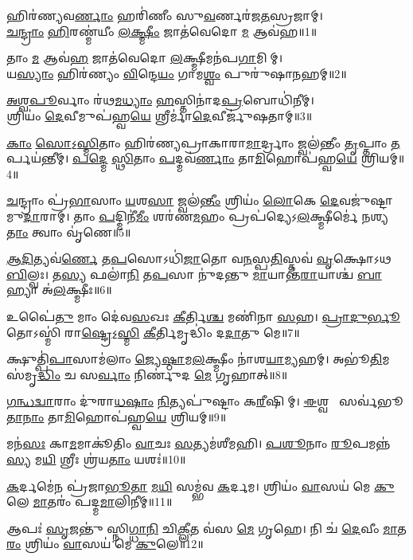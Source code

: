 

{\centering
𑌹𑌿𑌰॑𑌣𑍍𑌯𑌵\ul{𑌰𑍍𑌣𑌾𑌂} 𑌹𑌰𑌿॑𑌣𑍀𑌂 𑌸𑍁\ul{𑌵}𑌰𑍍𑌣𑌰॑𑌜\ul{𑌤}𑌸𑍍𑌰𑌜𑌾𑌮𑍍।\\
\ul{𑌚}\ul{𑌨𑍍𑌦𑍍𑌰𑌾𑌂} \ul{𑌹𑌿}𑌰𑌣𑍍𑌮॑𑌯𑍀𑌂 \ul{𑌲}\ul{𑌕𑍍𑌷𑍍𑌮𑍀𑌂} 𑌜𑌾𑌤॑𑌵𑍇𑌦𑍋 \ul{𑌮} 𑌆𑌵॑𑌹॥1॥

𑌤𑌾𑌂 \ul{𑌮} 𑌆𑌵॑\ul{𑌹} 𑌜𑌾𑌤॑𑌵𑍇𑌦𑍋 \ul{𑌲}𑌕𑍍𑌷𑍍𑌮𑍀𑌮𑌨॑𑌪\ul{𑌗𑌾}𑌮𑌿𑌨𑍀᳚𑌮𑍍।\\
𑌯\ul{𑌸𑍍𑌯𑌾𑌂} 𑌹𑌿𑌰॑𑌣𑍍𑌯𑌂 \ul{𑌵𑌿}𑌨𑍍𑌦𑍇\ul{𑌯𑌂} 𑌗𑌾𑌮\ul{𑌶𑍍𑌵𑌂} 𑌪𑍁𑌰𑍁॑𑌷𑌾\ul{𑌨}𑌹𑌮𑍍॥2॥

\ul{𑌅}\ul{𑌶𑍍𑌵}\ul{𑌪𑍂}𑌰𑍍𑌵𑌾𑌂 𑌰॑𑌥\ul{𑌮}\ul{𑌧𑍍𑌯𑌾𑌂} \ul{𑌹}𑌸𑍍𑌤𑌿𑌨𑌾॑𑌦\ul{𑌪𑍍𑌰}𑌬𑍋𑌧𑌿॑𑌨𑍀𑌮𑍍।\\
𑌶𑍍𑌰𑌿𑌯𑌂॑ \ul{𑌦𑍇}𑌵𑍀𑌮𑍁𑌪॑𑌹𑍍𑌵\ul{𑌯𑍇} 𑌶𑍍𑌰𑍀𑌰𑍍𑌮𑌾॑\ul{𑌦𑍇}𑌵𑍀𑌰𑍍𑌜𑍁॑𑌷𑌤𑌾𑌮𑍍॥3॥

}

\ul{𑌕𑌾𑌂} \ul{𑌸𑍋}𑌽॒\ul{𑌸𑍍𑌮𑌿}𑌤𑌾𑌂 𑌹𑌿𑌰॑𑌣𑍍𑌯𑌪𑍍𑌰𑌾𑌕𑌾𑌰𑌾\ul{𑌮𑌾}𑌰𑍍𑌦𑍍𑌰𑌾𑌂 𑌜𑍍𑌵𑌲॑𑌨𑍍𑌤𑍀𑌂 \ul{𑌤𑍃}𑌪𑍍𑌤𑌾𑌂 \ul{𑌤}𑌰𑍍𑌪𑌯॑𑌨𑍍𑌤𑍀𑌮𑍍।
\ul{𑌪}\ul{𑌦𑍍𑌮𑍇} \ul{𑌸𑍍𑌥𑌿}𑌤𑌾𑌂 \ul{𑌪}𑌦𑍍𑌮𑌵॑\ul{𑌰𑍍𑌣𑌾𑌂} 𑌤𑌾\ul{𑌮𑌿}𑌹𑍋𑌪॑𑌹𑍍𑌵\ul{𑌯𑍇} 𑌶𑍍𑌰𑌿𑌯𑌮𑍍॥4॥

\ul{𑌚}𑌨𑍍𑌦𑍍𑌰𑌾𑌂 𑌪𑍍𑌰॑\ul{𑌭𑌾}𑌸𑌾𑌂 \ul{𑌯}𑌶\ul{𑌸𑌾} 𑌜𑍍𑌵𑌲॑\ul{𑌨𑍍𑌤𑍀𑌂} 𑌶𑍍𑌰𑌿𑌯𑌂॑ \ul{𑌲𑍋}𑌕𑍇 \ul{𑌦𑍇}𑌵𑌜𑍁॑𑌷𑍍𑌟𑌾𑌮𑍁\ul{𑌦𑌾}𑌰𑌾𑌮𑍍।
𑌤𑌾𑌂 \ul{𑌪}𑌦𑍍𑌮𑌿𑌨𑍀॑\ul{𑌮𑍀𑌂} 𑌶𑌰॑𑌣\ul{𑌮}𑌹𑌂 𑌪𑍍𑌰𑌪॑𑌦𑍍𑌯𑍇𑌽\ul{𑌲}𑌕𑍍𑌷𑍍𑌮𑍀𑌰𑍍𑌮𑍇॑ 𑌨𑌶𑍍𑌯\ul{𑌤𑌾𑌂} 𑌤𑍍𑌵𑌾𑌂 𑌵𑍃॑𑌣𑍇॥5॥

\ul{𑌆}\ul{𑌦𑌿}𑌤𑍍𑌯𑌵॑\ul{𑌰𑍍𑌣𑍇} 𑌤\ul{𑌪}𑌸𑍋𑌽𑌧𑌿॑\ul{𑌜𑌾}𑌤𑍋 𑌵\ul{𑌨}𑌸𑍍𑌪\ul{𑌤𑌿}𑌸𑍍𑌤𑌵॑ \ul{𑌵𑍃}𑌕𑍍𑌷𑍋𑌽𑌥 \ul{𑌬𑌿}𑌲𑍍𑌵𑌃।
𑌤\ul{𑌸𑍍𑌯} 𑌫𑌲𑌾॑\ul{𑌨𑌿} 𑌤\ul{𑌪}𑌸𑌾 𑌨𑍁॑𑌦𑌨𑍍𑌤𑍁 \ul{𑌮𑌾}𑌯𑌾𑌨𑍍𑌤॑\ul{𑌰𑌾}𑌯𑌾𑌶𑍍𑌚॑ \ul{𑌬𑌾}𑌹𑍍𑌯𑌾 𑌅॑\ul{𑌲}𑌕𑍍𑌷𑍍𑌮𑍀𑌃॥6॥

𑌉𑌪𑍈॑\ul{𑌤𑍁} 𑌮𑌾𑌂 𑌦𑍇॑𑌵\ul{𑌸}𑌖𑌃 \ul{𑌕𑍀}𑌰𑍍𑌤𑌿\ul{𑌶𑍍𑌚} 𑌮𑌣𑌿॑𑌨𑌾 \ul{𑌸}𑌹।
\ul{𑌪𑍍𑌰𑌾}\ul{𑌦𑍁}\ul{𑌰𑍍𑌭𑍂}𑌤𑍋𑌽𑌸𑍍𑌮𑌿॑ 𑌰𑌾\ul{𑌷𑍍𑌟𑍍𑌰𑍇}𑌽॒\ul{𑌸𑍍𑌮𑌿}\an{} \ul{𑌕𑍀}𑌰𑍍𑌤𑌿𑌮𑍃𑌦𑍍𑌧𑌿𑌂॑ 𑌦\ul{𑌦𑌾}𑌤𑍁 𑌮𑍇॥7॥

𑌕𑍍𑌷𑍁𑌤𑍍𑌪𑌿॑\ul{𑌪𑌾}𑌸𑌾𑌮॑𑌲𑌾𑌂 \ul{𑌜𑍍𑌯𑍇}\ul{𑌷𑍍𑌠𑌾}𑌮\ul{𑌲}𑌕𑍍𑌷𑍍𑌮𑍀𑌂 𑌨𑌾॑𑌶\ul{𑌯𑌾}𑌮𑍍𑌯𑌹𑌮𑍍।
𑌅𑌭𑍂॑\ul{𑌤𑌿}\-𑌮𑌸॑𑌮𑍃\ul{𑌦𑍍𑌧𑌿𑌂} 𑌚 𑌸\ul{𑌰𑍍𑌵𑌾𑌂} 𑌨𑌿𑌰𑍍𑌣𑍁॑𑌦 \ul{𑌮𑍇} 𑌗𑍃𑌹𑌾𑌤𑍍॥8॥

\ul{𑌗}\ul{𑌨𑍍𑌧}\ul{𑌦𑍍𑌵𑌾}𑌰𑌾𑌂 𑌦𑍁॑𑌰𑌾\ul{𑌧}\ar{}\ul{𑌷𑌾𑌂} \ul{𑌨𑌿}𑌤𑍍𑌯𑌪𑍁॑𑌷𑍍𑌟𑌾𑌂 𑌕\ul{𑌰𑍀}𑌷𑌿𑌣𑍀᳚𑌮𑍍।
\ul{𑌈}𑌶𑍍𑌵𑌰𑍀𑌂᳚ 𑌸𑌰𑍍𑌵॑𑌭𑍂\ul{𑌤𑌾}\ul{𑌨𑌾𑌂} 𑌤𑌾\ul{𑌮𑌿}𑌹𑍋𑌪॑𑌹𑍍𑌵\ul{𑌯𑍇} 𑌶𑍍𑌰𑌿𑌯𑌮𑍍॥9॥

𑌮𑌨॑\ul{𑌸𑌃} 𑌕𑌾\ul{𑌮}𑌮𑌾𑌕𑍂॑𑌤𑌿𑌂 \ul{𑌵𑌾}𑌚𑌃 \ul{𑌸}𑌤𑍍𑌯𑌮॑𑌶𑍀𑌮𑌹𑌿।
\ul{𑌪}\ul{𑌶𑍂}𑌨𑌾𑌂 \ul{𑌰𑍂}𑌪𑌮𑌨𑍍𑌨॑\ul{𑌸𑍍𑌯} 𑌮\ul{𑌯𑌿} 𑌶𑍍𑌰𑍀𑌃 𑌶𑍍𑌰॑𑌯\ul{𑌤𑌾𑌂} 𑌯𑌶𑌃॑॥10॥

\ul{𑌕}𑌰𑍍𑌦𑌮𑍇॑𑌨 𑌪𑍍𑌰॑𑌜𑌾\ul{𑌭𑍂}\ul{𑌤𑌾} \ul{𑌮}\ul{𑌯𑌿} 𑌸𑌮𑍍𑌭॑𑌵 \ul{𑌕}𑌰𑍍𑌦𑌮।
𑌶𑍍𑌰𑌿𑌯𑌂॑ \ul{𑌵𑌾}𑌸𑌯॑ 𑌮𑍇 \ul{𑌕𑍁}𑌲𑍇 \ul{𑌮𑌾}𑌤𑌰𑌂॑ 𑌪𑌦𑍍𑌮\ul{𑌮𑌾}𑌲𑌿𑌨𑍀𑌮𑍍॥11॥

𑌆𑌪𑌃॑ \ul{𑌸𑍃}𑌜𑌨𑍍𑌤𑍁॑ 𑌸𑍍𑌨𑌿\ul{𑌗𑍍𑌧𑌾}\ul{𑌨𑌿} 𑌚𑌿\ul{𑌕𑍍𑌲𑍀}𑌤 𑌵॑𑌸 \ul{𑌮𑍇} 𑌗𑍃𑌹𑍇।
𑌨𑌿 𑌚॑ \ul{𑌦𑍇}𑌵𑍀𑌂 \ul{𑌮𑌾}𑌤\ul{𑌰𑌂} 𑌶𑍍𑌰𑌿𑌯𑌂॑ \ul{𑌵𑌾}𑌸𑌯॑ 𑌮𑍇 \ul{𑌕𑍁}𑌲𑍇॥12॥

